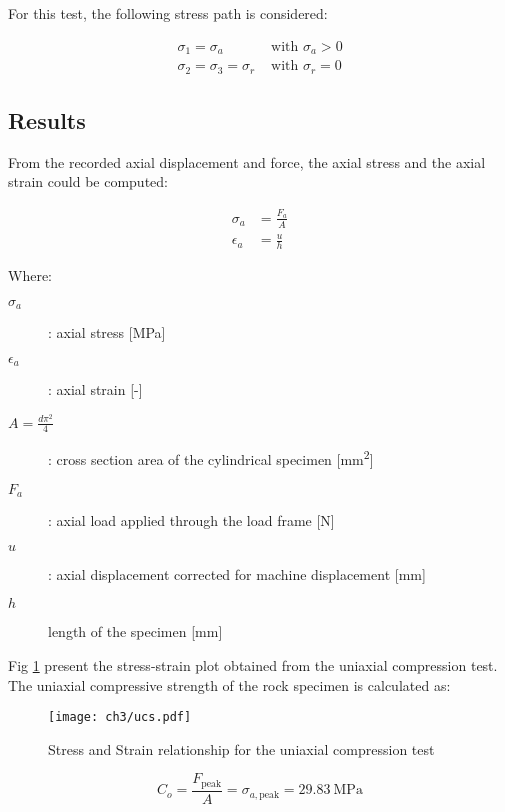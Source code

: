 For this test, the following stress path is considered: 

\begin{align}
    \sigma_1 = \sigma_a &\text{ with } \sigma_a > 0 \\
    \sigma_2 = \sigma_3 = \sigma_r   &\text{ with } \sigma_r = 0
\end{align}

\subsection{Results}

From the recorded axial displacement and force, the axial stress and the axial strain could be computed: 

\begin{align}
    \sigma_a &= \frac{F_a}{A} \\
    \epsilon_a &= \frac{u}{h}
\end{align}

Where:

\begin{description}
    \item[$\sigma_a$] : axial stress  [\si{\mega\pascal}]
    \item[$\epsilon_a$] : axial strain [-]
    \item[$A=\frac{d\pi^2}{4}$] : cross section area of the cylindrical specimen [\si{\milli\meter\squared}]
    \item[$F_a$] :  axial load applied through the load frame [\si{\newton}]
    \item[$u$] : axial displacement corrected for machine displacement [\si{\milli\meter}]
    \item[$h$]  length of the specimen [\si{\milli\meter}]
\end{description}

Fig \ref{fig3:2} present the stress-strain plot obtained from the uniaxial compression test. The uniaxial compressive strength of the rock specimen is calculated as: 


\begin{figure}[tb]
    \centering
    \texttt{[image: ch3/ucs.pdf]}
    \caption{Stress and Strain relationship for the uniaxial compression test}
    \label{fig3:2}
\end{figure} 

\begin{equation}
    C_o = \frac{F_\text{peak}}{A} = \sigma_{a,\text{peak}} = \SI{29.83}{\mega\pascal}
\end{equation}

